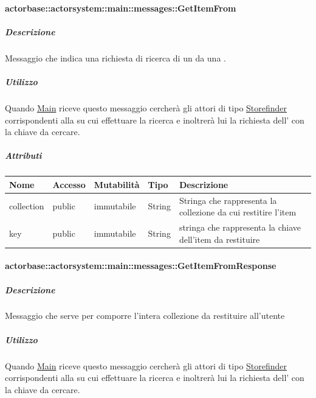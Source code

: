 \documentclass{scalatekids-article}
\begin{document}
\paragraph{actorbase::actorsystem::main::messages::GetItemFrom}
\label{sec:actorbase::actorsystem::main::messages::GetItemFrom}

\subparagraph{Descrizione}

Messaggio che indica una richiesta di ricerca di un  da una .

\subparagraph{Utilizzo}

Quando \hyperref[sec:actorbase::actorsystem::main::Main]{Main}
riceve questo messaggio cercherà gli attori di tipo
\hyperref[sec:actorbase::actorsystem::storefinder::Storefinder]{Storefinder}
corrispondenti alla  su cui effettuare la ricerca
e inoltrerà lui la richiesta dell' con la chiave da cercare.

\subparagraph{Attributi}
\begin{tabular}{| p{3cm} | p{1.5cm} | p{2cm} | p{2cm} | p{8.5cm} |}
  \hline
  Nome & Accesso & Mutabilità & Tipo & Descrizione\\
  \hline
  collection & public & immutabile & String & Stringa che rappresenta la collezione da cui restitire l'item\\
  \hline
  key & public & immutabile & String & stringa che rappresenta la chiave dell'item da restituire \\
  \hline
\end{tabular}

\paragraph{actorbase::actorsystem::main::messages::GetItemFromResponse}
\label{sec:actorbase::actorsystem::main::messages::GetItemFromResponse}

\subparagraph{Descrizione}

Messaggio che serve per comporre l'intera collezione da restituire all'utente

\subparagraph{Utilizzo}

Quando \hyperref[sec:actorbase::actorsystem::main::Main]{Main}
riceve questo messaggio cercherà gli attori di tipo
\hyperref[sec:actorbase::actorsystem::storefinder::Storefinder]{Storefinder}
corrispondenti alla  su cui effettuare la ricerca
e inoltrerà lui la richiesta dell' con la chiave da cercare.
\end{document}
